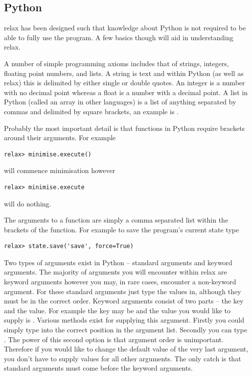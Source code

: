 
\subsection{Python}

relax has been designed such that knowledge about Python is not required to be able to fully use the program.
A few basics though will aid in understanding relax.

A number of simple programming axioms includes that of strings, integers, floating point numbers, and lists.
A string is text and within Python (as well as relax) this is delimited by either single or double quotes.
An integer is a number with no decimal point whereas a float is a number with a decimal point.
A list in Python (called an array in other languages) is a list of anything separated by commas and delimited by square brackets, an example is \prompt{[0, 1, 2, `a', 1.2143235]}.

Probably the most important detail is that functions in Python require brackets around their arguments.
For example

\begin{lstlisting}[numbers=none]
relax> minimise.execute()
\end{lstlisting}

will commence minimisation however

\begin{lstlisting}[numbers=none]
relax> minimise.execute
\end{lstlisting}

will do nothing.

The arguments to a function are simply a comma separated list within the brackets of the function.
For example to save the program's current state type

\begin{lstlisting}[numbers=none]
relax> state.save('save', force=True)
\end{lstlisting}

Two types of arguments exist in Python -- standard arguments and keyword arguments.
The majority of arguments you will encounter within relax are keyword arguments however you may, in rare cases, encounter a non-keyword argument.
For these standard arguments just type the values in, although they must be in the correct order.
Keyword arguments consist of two parts -- the key and the value.
For example the key may be  and the value you would like to supply is .
Various methods exist for supplying this argument.
Firstly you could simply type  into the correct position in the argument list.
Secondly you can type .
The power of this second option is that argument order is unimportant.
Therefore if you would like to change the default value of the very last argument, you don't have to supply values for all other arguments.
The only catch is that standard arguments must come before the keyword arguments.


